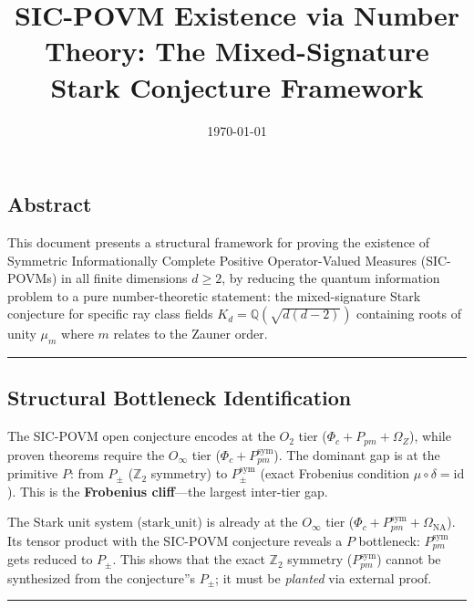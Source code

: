 \documentclass[12pt,a4paper]{article}
\begin{document}
\title{SIC-POVM Existence via Number Theory: The Mixed-Signature Stark Conjecture Framework}
\date{\today}

\maketitle

\subsection{Abstract}

This document presents a structural framework for proving the existence of Symmetric Informationally Complete Positive Operator-Valued Measures (SIC-POVMs) in all finite dimensions $d \geq 2$, by reducing the quantum information problem to a pure number-theoretic statement: the mixed-signature Stark conjecture for specific ray class fields $K_d = \mathbb{Q}(\sqrt{d(d-2)})$ containing roots of unity $\mu_m$ where $m$ relates to the Zauner order.

\begin{center}
\rule{0.5\textwidth}{0.4pt}
\end{center}

\subsection{Structural Bottleneck Identification}

The SIC-POVM open conjecture encodes at the $O_2$ tier ($\Phi_c + P_{pm} + \Omega_Z$), while proven theorems require the $O_{\infty}$ tier ($\Phi_c + P_{pm}^{\text{sym}}$). The dominant gap is at the primitive \textbf{$P$}: from $P_{\pm}$ ($\mathbb{Z}_2$ symmetry) to $P_{\pm}^{\text{sym}}$ (exact Frobenius condition $\mu \circ \delta = \text{id}$). This is the \textbf{Frobenius cliff}---the largest inter-tier gap.

The Stark unit system ($\text{stark\_unit}$) is already at the $O_{\infty}$ tier ($\Phi_c + P_{pm}^{\text{sym}} + \Omega_{\text{NA}}$). Its tensor product with the SIC-POVM conjecture reveals a $P$ bottleneck: $P_{pm}^{\text{sym}}$ gets reduced to $P_{\pm}$. This shows that the exact $\mathbb{Z}_2$ symmetry ($P_{pm}^{\text{sym}}$) cannot be synthesized from the conjecture''s $P_{\pm}$; it must be \emph{planted} via external proof.

\begin{center}
\rule{0.5\textwidth}{0.4pt}
\end{center}
\end{document}
